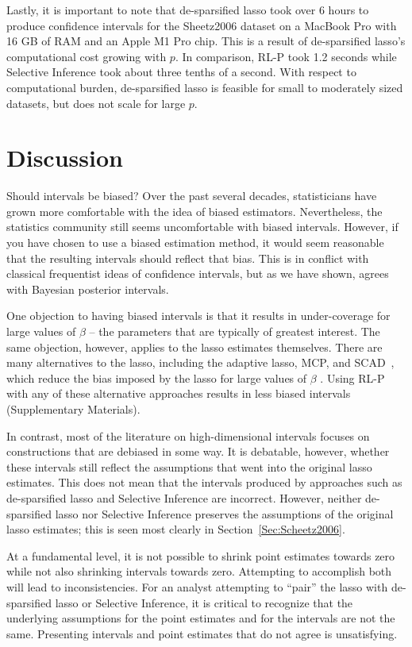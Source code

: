 Lastly, it is important to note that de-sparsified lasso took over 6 hours to produce confidence intervals for the Sheetz2006 dataset on a MacBook Pro with 16 GB of RAM and an Apple M1 Pro chip. This is a result of de-sparsified lasso's computational cost growing with $p$. In comparison, RL-P took 1.2 seconds while Selective Inference took about three tenths of a second. With respect to computational burden, de-sparsified lasso is feasible for small to moderately sized datasets, but does not scale for large $p$.


\section{Discussion} \label{Sec:discussion}

Should intervals be biased? Over the past several decades, statisticians have grown more comfortable with the idea of biased estimators. Nevertheless, the statistics community still seems uncomfortable with biased intervals. However, if you have chosen to use a biased estimation method, it would seem reasonable that the resulting intervals should reflect that bias. This is in conflict with classical frequentist ideas of confidence intervals, but as we have shown, agrees with Bayesian posterior intervals.

One objection to having biased intervals is that it results in under-coverage for large values of $\beta$ -- the parameters that are typically of greatest interest. The same objection, however, applies to the lasso estimates themselves. There are many alternatives to the lasso, including the adaptive lasso, MCP, and SCAD , which reduce the bias imposed by the lasso for large values of $\beta$ \citep{Zou2006, Zhang2010, Fan2001}. Using RL-P with any of these alternative approaches results in less biased intervals (Supplementary Materials).

In contrast, most of the literature on high-dimensional intervals focuses on constructions that are debiased in some way. It is debatable, however, whether these intervals still reflect the assumptions that went into the original lasso estimates. This does not mean that the intervals produced by approaches such as de-sparsified lasso and Selective Inference are incorrect. However, neither de-sparsified lasso nor Selective Inference preserves the assumptions of the original lasso estimates; this is seen most clearly in Section~\ref{Sec:Scheetz2006}.

At a fundamental level, it is not possible to shrink point estimates towards zero while not also shrinking intervals towards zero. Attempting to accomplish both will lead to inconsistencies. For an analyst attempting to ``pair'' the lasso with de-sparsified lasso or Selective Inference, it is critical to recognize that the underlying assumptions for the point estimates and for the intervals are not the same. Presenting intervals and point estimates that do not agree is unsatisfying.
 
